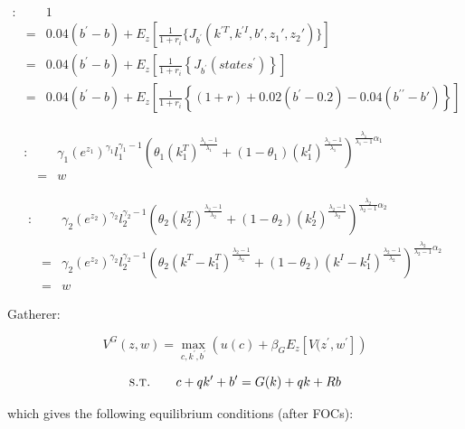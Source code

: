 \documentclass{article}
\begin{document}
\begin{eqnarray}
     [b^{\prime }]: & &   1 \nonumber \\
     & = &  0.04(b^\prime - b) +  E_z\left[\frac{1}{1+r_i} \{ J_{b^{\prime}}(k^{\prime T},k^{\prime I},b{\prime},z_{1}{\prime },z_{2}{\prime}) \}  \right] \nonumber \\
     & = &  0.04(b^\prime - b) +  E_z\left[\frac{1}{1+r_i} \left\lbrace  J_{b^{\prime}}(states^\prime) \right\rbrace  \right] \nonumber \\
     & = &  0.04(b^\prime - b) +  E_z\left[\frac{1}{1+r_i} \left\lbrace  (1+r) + 0.02(b^\prime - 0.2) - 0.04(b^{\prime \prime} -b\prime) \right\rbrace  \right] \quad \quad
\end{eqnarray}

\begin{eqnarray}
     [l_1]: & &  \gamma_1 (e^{z_1})^{\gamma_1} l_1^{\gamma_1 - 1} \left( \theta_1 (k_{1}^T)^{\frac{\lambda_1-1}{\lambda_1}} +(1-\theta_1)(k_{1}^I)^{\frac{\lambda_1-1}{\lambda_1}} \right)^{\frac{\lambda_1}{\lambda_1-1}\alpha_1}  \quad \quad \quad \quad \quad  \nonumber \\
     & = &  w  \quad \quad
\end{eqnarray}

\begin{eqnarray}
     [l_2]: & &  \gamma_2 (e^{z_2 })^{\gamma_2} l_2^{\gamma_2 - 1} \left( \theta_2 (k_{2}^T)^{\frac{\lambda_2-1}{\lambda_2}} +(1-\theta_2)(k_{2}^I)^{\frac{\lambda_2-1}{\lambda_2}} \right)^{\frac{\lambda_2}{\lambda_2-1}\alpha_2}  \nonumber \\
     & = &  \gamma_2 (e^{z_2 })^{\gamma_2} l_2^{\gamma_2 - 1} \left( \theta_2 (k^T - k_{1}^T)^{\frac{\lambda_2-1}{\lambda_2}} +(1-\theta_2)(k^I -k_{1}^I)^{\frac{\lambda_2-1}{\lambda_2}} \right)^{\frac{\lambda_2}{\lambda_2-1}\alpha_2}  \nonumber \\
     & = &  w  \quad \quad
\end{eqnarray}










Gatherer:

$$ V^G(z,w) = \max_{c,k^{\prime},b^{\prime} } \left( u(c) + \beta_G E_z \left[ V(z^{\prime},w^{\prime} \right]  \right) $$

$$ \textsc{s.t.} \quad \quad c+qk^\prime+b^\prime = G(k) + qk +Rb$$

which gives the following equilibrium conditions (after FOCs):
\end{document}
